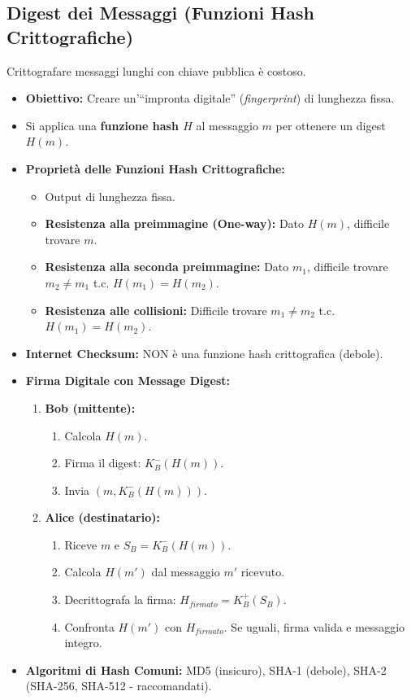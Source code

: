\subsection{Digest dei Messaggi (Funzioni Hash Crittografiche)}
Crittografare messaggi lunghi con chiave pubblica è costoso.
\begin{itemize}
    \item \textbf{Obiettivo:} Creare un'\textquotedblleft impronta digitale\textquotedblright{} (\textit{fingerprint}) di lunghezza fissa.
    \item Si applica una \textbf{funzione hash $H$} al messaggio $m$ per ottenere un digest $H(m)$.
    \item \textbf{Proprietà delle Funzioni Hash Crittografiche:}
    \begin{itemize}
        \item Output di lunghezza fissa.
        \item \textbf{Resistenza alla preimmagine (One-way):} Dato $H(m)$, difficile trovare $m$.
        \item \textbf{Resistenza alla seconda preimmagine:} Dato $m_1$, difficile trovare $m_2 \neq m_1$ t.c. $H(m_1) = H(m_2)$.
        \item \textbf{Resistenza alle collisioni:} Difficile trovare $m_1 \neq m_2$ t.c. $H(m_1) = H(m_2)$.
    \end{itemize}
    \item \textbf{Internet Checksum:} NON è una funzione hash crittografica (debole).
    \item \textbf{Firma Digitale con Message Digest:}
    \begin{enumerate}
        \item \textbf{Bob (mittente):}
        \begin{enumerate}
            \item Calcola $H(m)$.
            \item Firma il digest: $K_B^-(H(m))$.
            \item Invia $(m, K_B^-(H(m)))$.
        \end{enumerate}
        \item \textbf{Alice (destinatario):}
        \begin{enumerate}
            \item Riceve $m$ e $S_B = K_B^-(H(m))$.
            \item Calcola $H(m')$ dal messaggio $m'$ ricevuto.
            \item Decrittografa la firma: $H_{firmato} = K_B^+(S_B)$.
            \item Confronta $H(m')$ con $H_{firmato}$. Se uguali, firma valida e messaggio integro.
        \end{enumerate}
    \end{enumerate}
    \item \textbf{Algoritmi di Hash Comuni:} MD5 (insicuro), SHA-1 (debole), SHA-2 (SHA-256, SHA-512 - raccomandati).
\end{itemize}

